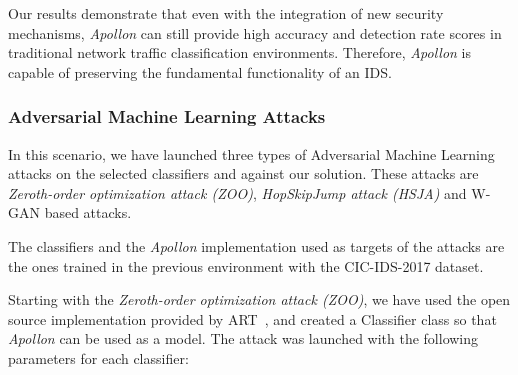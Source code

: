 \begin{table}
    \centering
    \caption{Results of the traditional network traffic and attacks scenario on the CIC-DDoS-2019 dataset.}
    \label{tab:traditional-network-results-2019}
\end{table}

Our results demonstrate that even with the integration of new security mechanisms, \textit{Apollon} can still provide high accuracy
and detection rate scores in traditional network traffic classification environments.
Therefore, \textit{Apollon} is capable of preserving the fundamental functionality of an IDS.

\subsubsection{Adversarial Machine Learning Attacks}
In this scenario, we have launched three types of Adversarial Machine Learning attacks on the selected classifiers and
against our solution.
These attacks are  \textit{Zeroth-order optimization attack (ZOO)}, \textit{HopSkipJump attack (HSJA)} and W-GAN based attacks.

The classifiers and the \textit{Apollon} implementation used as targets of the attacks are the ones trained in the previous environment
with the CIC-IDS-2017 dataset.

Starting with the  \textit{Zeroth-order optimization attack (ZOO)}, we have used the open source implementation provided by ART~\cite{art2018},
and created a Classifier class so that \textit{Apollon} can be used as a model.
The attack was launched with the following parameters for each classifier:

